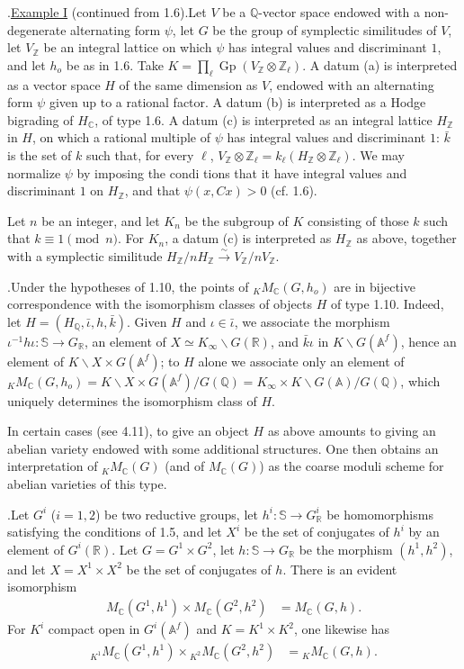 \documentclass[10pt]{article}
\newcommand{\A}{\mathbb A}
\newcommand{\Af}{\mathbb A^f}
\newcommand{\C}{\mathbb C}
\newcommand{\Q}{\mathbb Q}
\newcommand{\R}{\mathbb R}
\newcommand{\Z}{\mathbb Z}
\newcommand{\bS}{\mathbb S}
\newcommand{\Gp}{\operatorname{Gp}}
\newcommand{\MC}{M_{\C}}
\begin{document}
.\quad \uline{Example I} (continued from 1.6).\quad Let $V$ be a $\Q$-vector space endowed with a non-degenerate alternating form $\psi$, let $G$ be the group of symplectic similitudes of $V$, let $V_\Z$ be an integral lattice on which $\psi$ has integral values and discriminant $1$, and let $h_o$ be as in 1.6. Take $K=\prod_\ell \Gp(V_\Z\otimes\Z_\ell)$. A datum (a) is interpreted as a vector space $H$ of the same dimension as $V$, endowed with an alternating form $\psi$ given up to a rational factor. A datum (b) is interpreted as a Hodge bigrading of $H_\C$, of type 1.6. A datum (c) is interpreted as an integral lattice $H_\Z$ in $H$, on which a rational multiple of $\psi$ has integral values and discriminant $1$: $\bar k$ is the set of $k$ such that, for every $\ell$, $V_\Z\otimes\Z_\ell=k_\ell(H_\Z\otimes\Z_\ell)$. We may normalize $\psi$ by imposing the condi%
tions that it have integral values and discriminant $1$ on $H_\Z$, and that $\psi(x,Cx)>0$ (cf. 1.6).

Let $n$ be an integer, and let $K_n$ be the subgroup of $K$ consisting of those $k$ such that $k\equiv1\pmod n$. For $K_n$, a datum (c) is interpreted as $H_\Z$ as above, together with a symplectic similitude $H_\Z/nH_\Z\xrightarrow{\sim}V_\Z/nV_\Z$.

.\quad Under the hypotheses of 1.10, the points of ${}_K\MC(G,h_o)$ are in bijective correspondence with the isomorphism classes of objects $H$ of type 1.10. Indeed, let $H=(H_\Q,\bar\iota,h,\bar k)$. Given $H$ and $\iota\in\bar\iota$, we associate the morphism $\iota^{-1}h\iota:\bS\to G_\R$, an element of $X\simeq K_\infty\backslash G(\R)$, and $\bar k\iota$ in $K\backslash G(\Af)$, hence an element of $K\backslash X\times G(\Af)$; to $H$ alone we associate only an element of ${}_K\MC(G,h_o)=K\backslash X\times G(\Af)/G(\Q)=K_\infty\times K\backslash G(\A)/G(\Q)$, which uniquely determines the isomorphism class of $H$.

In certain cases (see 4.11), to give an object $H$ as above amounts to giving an abelian variety endowed with some additional structures. One then obtains an interpretation of ${}_K\MC(G)$ (and of $\MC(G)$) as the coarse moduli scheme for abelian varieties of this type.

.\quad Let $G^i$ ($i=1,2$) be two reductive groups, let $h^i:\bS\to G^i_\R$ be homomorphisms satisfying the conditions of 1.5, and let $X^i$ be the set of conjugates of $h^i$ by an element of $G^i(\R)$. Let $G=G^1\times G^2$, let $h:\bS\to G_\R$ be the morphism $(h^1,h^2)$, and let $X=X^1\times X^2$ be the set of conjugates of $h$. There is an evident isomorphism
\begingroup
\makeatletter
\tagsleft@true
\makeatother
\begin{align}
\MC(G^1,h^1)\times\MC(G^2,h^2)&=\MC(G,h). \tag{1.13.1}
\end{align}
\endgroup
For $K^i$ compact open in $G^i(\Af)$ and $K=K^1\times K^2$, one likewise has
\begingroup
\makeatletter
\tagsleft@true
\makeatother
\begin{align}
{}_{K^1}\MC(G^1,h^1)\times{}_{K^2}\MC(G^2,h^2)&={}_K\MC(G,h). \tag{1.13.2}
\end{align}
\endgroup
\end{document}
